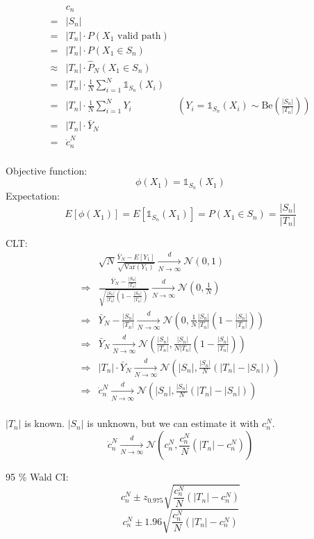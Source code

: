 \documentclass{article}
\begin{document}
\begin{align*}
   & c_n \\
   =& |S_n| \\
   =& |T_n|\cdot P(X_1\text{ valid path}) \\
   =& |T_n|\cdot P(X_1\in S_n) \\
   \approx& |T_n|\cdot \hat{P}_N(X_1\in S_n) \\
   =& |T_n|\cdot \frac{1}{N}\sum_{i=1}^N\mathds{1}_{S_n}(X_i) \\
   =& |T_n|\cdot \frac{1}{N}\sum_{i=1}^N Y_i & (Y_i=\mathds{1}_{S_n}(X_i)\sim \text{Be}\left(\frac{|S_n|}{|T_n|}\right)) \\
   =& |T_n|\cdot \bar{Y}_N \\
   =& \dot{c}_n^N \\
\end{align*}

Objective function:
\[\phi(X_1) = \mathds{1}_{S_n}(X_1)\]
Expectation:
\[E[\phi(X_1)] = E[\mathds{1}_{S_n}(X_1)] = P(X_1 \in S_n) = \frac{|S_n|}{|T_n|}\]

CLT:
\begin{align*}
   & \sqrt{N}\frac{\bar{Y}_N-E[Y_1]}{\sqrt{\text{Var}(Y_1)}} \xrightarrow[N\to\infty]{d} \mathcal{N}(0,1) \\
   \Rightarrow& \frac{\bar{Y}_N-\frac{|S_n|}{|T_n|}}{\sqrt{\frac{|S_n|}{|T_n|}(1-\frac{|S_n|}{|T_n|})}} \xrightarrow[N\to\infty]{d} \mathcal{N}(0,\frac{1}{N}) \\
   \Rightarrow& \bar{Y}_N-\frac{|S_n|}{|T_n|} \xrightarrow[N\to\infty]{d} \mathcal{N}(0,\frac{1}{N}\frac{|S_n|}{|T_n|}(1-\frac{|S_n|}{|T_n|})) \\
   \Rightarrow& \bar{Y}_N \xrightarrow[N\to\infty]{d} \mathcal{N}\left(\frac{|S_n|}{|T_n|},\frac{|S_n|}{N|T_n|}(1-\frac{|S_n|}{|T_n|})\right) \\
   \Rightarrow& |T_n|\cdot\bar{Y}_N \xrightarrow[N\to\infty]{d} \mathcal{N}\left(|S_n|,\frac{|S_n|}{N}(|T_n|-|S_n|)\right) \\
   \Rightarrow& \dot{c}_n^N \xrightarrow[N\to\infty]{d} \mathcal{N}\left(|S_n|,\frac{|S_n|}{N}(|T_n|-|S_n|)\right) \\
\end{align*}

\(|T_n|\) is known.
\(|S_n|\) is unknown, but we can estimate it with \(c_n^N\).
\[\dot{c}_n^N \xrightarrow[N\to\infty]{d} \mathcal{N}\left(c_n^N,\frac{c_n^N}{N}(|T_n|-c_n^N)\right)\]

95 \% Wald CI:
\[c_n^N \pm z_{0.975}\sqrt{\frac{c_n^N}{N}(|T_n|-c_n^N)}\]
\[c_n^N \pm 1.96\sqrt{\frac{c_n^N}{N}(|T_n|-c_n^N)}\]
\end{document}
